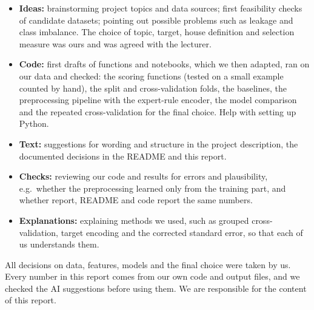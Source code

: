 \documentclass[11pt,a4paper]{article}
\begin{document}
\begin{itemize}
  \item \textbf{Ideas:} brainstorming project topics and data sources; first feasibility checks of candidate
  datasets; pointing out possible problems such as leakage and class imbalance. The choice of topic, target,
  house definition and selection measure was ours and was agreed with the lecturer.
  \item \textbf{Code:} first drafts of functions and notebooks, which we then adapted, ran on our data and
  checked: the scoring functions (tested on a small example counted by hand), the split and cross-validation
  folds, the baselines, the preprocessing pipeline with the expert-rule encoder, the model comparison and the
  repeated cross-validation for the final choice. Help with setting up Python.
  \item \textbf{Text:} suggestions for wording and structure in the project description, the documented
  decisions in the README and this report.
  \item \textbf{Checks:} reviewing our code and results for errors and plausibility, e.g.\ whether the
  preprocessing learned only from the training part, and whether report, README and code report the same numbers.
  \item \textbf{Explanations:} explaining methods we used, such as grouped cross-validation, target encoding and
  the corrected standard error, so that each of us understands them.
\end{itemize}

All decisions on data, features, models and the final choice were taken by us. Every number in this report
comes from our own code and output files, and we checked the AI suggestions before using them. We are
responsible for the content of this report.
\end{document}
